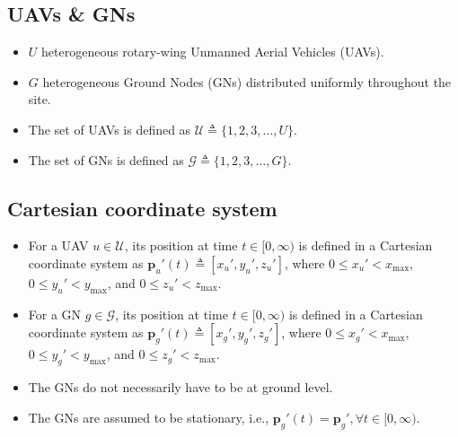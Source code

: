 \documentclass{article}
\begin{document}
\subsection{UAVs \& GNs}
\begin{itemize}
    \item $U$ heterogeneous rotary-wing Unmanned Aerial Vehicles (UAVs).
    \item $G$ heterogeneous Ground Nodes (GNs) distributed uniformly throughout the site.
    \item The set of UAVs is defined as $\mathcal{U}{\triangleq}\{1,2,3,{\dots},U\}$.
    \item The set of GNs is defined as $\mathcal{G}{\triangleq}\{1,2,3,{\dots},G\}$.
\end{itemize}

\subsection{Cartesian coordinate system}
\begin{itemize}
    \item For a UAV $u{\in}\mathcal{U}$, its position at time $t{\in}[0,\infty)$ is defined in a Cartesian coordinate system as $\mathbf{p}_{u}'(t){\triangleq}[x_{u}',y_{u}',z_{u}']$, where $0{\leq}x_{u}'{<}x_{\mathrm{max}}$, $0{\leq}y_{u}'{<}y_{\mathrm{max}}$, and $0{\leq}z_{u}'{<}z_{\mathrm{max}}$.
    \item For a GN $g{\in}\mathcal{G}$, its position at time $t{\in}[0,\infty)$ is defined in a Cartesian coordinate system as $\mathbf{p}_{g}'(t){\triangleq}[x_{g}',y_{g}',z_{g}']$, where $0{\leq}x_{g}'{<}x_{\mathrm{max}}$, $0{\leq}y_{g}'{<}y_{\mathrm{max}}$, and $0{\leq}z_{g}'{<}z_{\mathrm{max}}$.
    \item The GNs do not necessarily have to be at ground level.
    \item The GNs are assumed to be stationary, i.e., $\mathbf{p}_{g}'(t){=}\mathbf{p}_{g}',{\forall}t{\in}[0,\infty)$.
\end{itemize}
\end{document}
